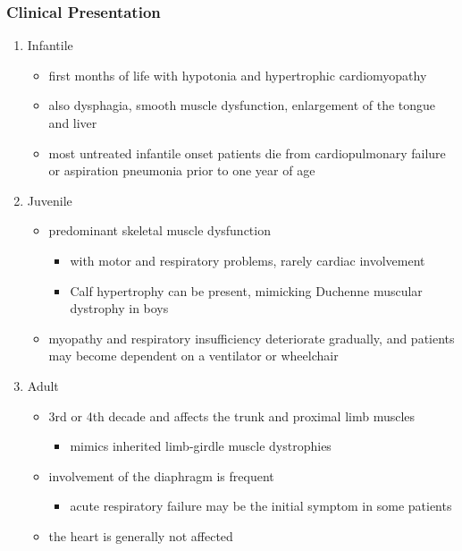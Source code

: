 \documentclass{scrartcl}
\begin{document}
\subsubsection{Clinical Presentation}
\label{sec:org6864f95}
\begin{enumerate}
\item Infantile
\label{sec:org60e5541}
\begin{itemize}
\item first months of life with hypotonia and hypertrophic cardiomyopathy
\item also dysphagia, smooth muscle dysfunction, enlargement of the tongue
and liver
\item most untreated infantile onset patients die from cardiopulmonary
failure or aspiration pneumonia prior to one year of age
\end{itemize}
\item Juvenile
\label{sec:orga877411}
\begin{itemize}
\item predominant skeletal muscle dysfunction
\begin{itemize}
\item with motor and respiratory problems, rarely cardiac involvement
\item Calf hypertrophy can be present, mimicking Duchenne muscular dystrophy in boys
\end{itemize}
\item myopathy and respiratory insufficiency deteriorate gradually, and patients may become dependent on a ventilator or wheelchair
\end{itemize}
\item Adult
\label{sec:org234bf01}
\begin{itemize}
\item 3rd or 4th decade and affects the trunk and proximal limb muscles
\begin{itemize}
\item mimics inherited limb-girdle muscle dystrophies
\end{itemize}
\item involvement of the diaphragm is frequent
\begin{itemize}
\item acute respiratory failure may be the initial symptom in some patients
\end{itemize}
\item the heart is generally not affected
\end{itemize}
\end{enumerate}
\end{document}
